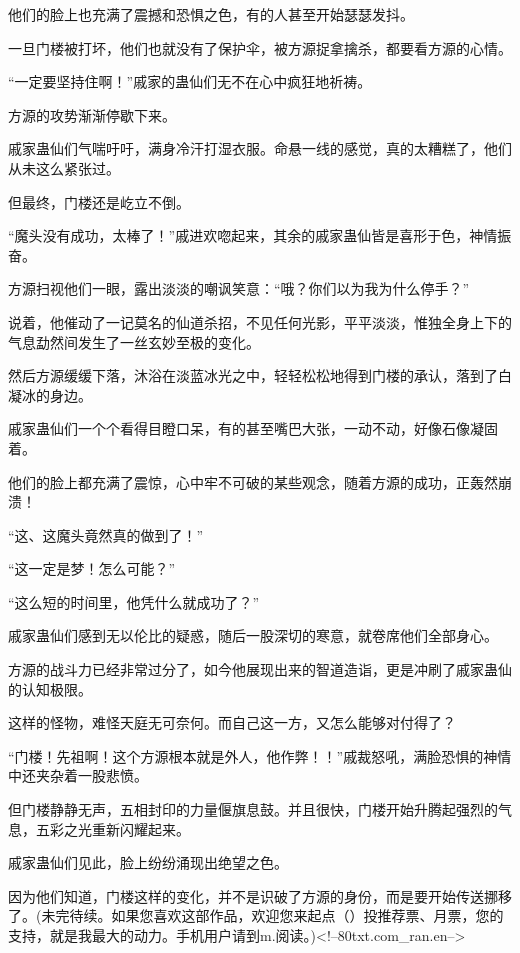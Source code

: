 \begin{this_body}
他们的脸上也充满了震撼和恐惧之色，有的人甚至开始瑟瑟发抖。

一旦门楼被打坏，他们也就没有了保护伞，被方源捉拿擒杀，都要看方源的心情。

“一定要坚持住啊！”戚家的蛊仙们无不在心中疯狂地祈祷。

方源的攻势渐渐停歇下来。

戚家蛊仙们气喘吁吁，满身冷汗打湿衣服。命悬一线的感觉，真的太糟糕了，他们从未这么紧张过。

但最终，门楼还是屹立不倒。

“魔头没有成功，太棒了！”戚进欢唿起来，其余的戚家蛊仙皆是喜形于色，神情振奋。

方源扫视他们一眼，露出淡淡的嘲讽笑意：“哦？你们以为我为什么停手？”

说着，他催动了一记莫名的仙道杀招，不见任何光影，平平淡淡，惟独全身上下的气息勐然间发生了一丝玄妙至极的变化。

然后方源缓缓下落，沐浴在淡蓝冰光之中，轻轻松松地得到门楼的承认，落到了白凝冰的身边。

戚家蛊仙们一个个看得目瞪口呆，有的甚至嘴巴大张，一动不动，好像石像凝固着。

他们的脸上都充满了震惊，心中牢不可破的某些观念，随着方源的成功，正轰然崩溃！

“这、这魔头竟然真的做到了！”

“这一定是梦！怎么可能？”

“这么短的时间里，他凭什么就成功了？”

戚家蛊仙们感到无以伦比的疑惑，随后一股深切的寒意，就卷席他们全部身心。

方源的战斗力已经非常过分了，如今他展现出来的智道造诣，更是冲刷了戚家蛊仙的认知极限。

这样的怪物，难怪天庭无可奈何。而自己这一方，又怎么能够对付得了？

“门楼！先祖啊！这个方源根本就是外人，他作弊！！”戚裁怒吼，满脸恐惧的神情中还夹杂着一股悲愤。

但门楼静静无声，五相封印的力量偃旗息鼓。并且很快，门楼开始升腾起强烈的气息，五彩之光重新闪耀起来。

戚家蛊仙们见此，脸上纷纷涌现出绝望之色。

因为他们知道，门楼这样的变化，并不是识破了方源的身份，而是要开始传送挪移了。(未完待续。如果您喜欢这部作品，欢迎您来起点（）投推荐票、月票，您的支持，就是我最大的动力。手机用户请到m.阅读。)<!--80txt.com\_ran.en-->

\end{this_body}


